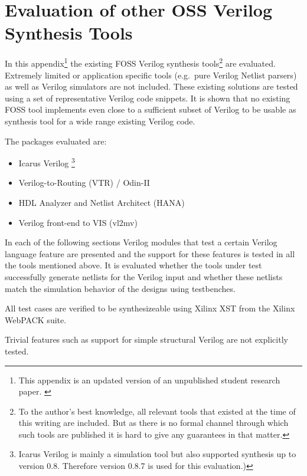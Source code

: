 
\chapter{Evaluation of other OSS Verilog Synthesis Tools}
\label{chapter:sota}

In this appendix\footnote{This appendix is an updated version of an
unpublished student research paper. \cite{VerilogFossEval}}
the existing FOSS Verilog synthesis tools\footnote{To the
author's best knowledge, all relevant tools that existed at the time of this
writing are included. But as there is no formal channel through which such
tools are published it is hard to give any guarantees in that matter.} are
evaluated. Extremely limited or application specific tools (e.g.~pure Verilog
Netlist parsers) as well as Verilog simulators are not included. These existing
solutions are tested using a set of representative Verilog code snippets. It is
shown that no existing FOSS tool implements even close to a sufficient subset
of Verilog to be usable as synthesis tool for a wide range existing Verilog code.

The packages evaluated are:

\begin{itemize}
\item Icarus Verilog \footnote{Icarus Verilog is mainly a simulation
tool but also supported synthesis up to version 0.8. Therefore version 0.8.7 is used
for this evaluation.)}
\item Verilog-to-Routing (VTR) / Odin-II \cite{vtr2012}\cite{Odin}
\item HDL Analyzer and Netlist Architect (HANA) 
\item Verilog front-end to VIS (vl2mv) \cite{Cheng93vl2mv:a}
\end{itemize}

In each of the following sections Verilog modules that test a certain Verilog
language feature are presented and the support for these features is tested in all
the tools mentioned above. It is evaluated whether the tools under test
successfully generate netlists for the Verilog input and whether these netlists
match the simulation behavior of the designs using testbenches.

All test cases are verified to be synthesizeable using Xilinx XST from the Xilinx
WebPACK  suite.

Trivial features such as support for simple structural Verilog are not explicitly tested.

